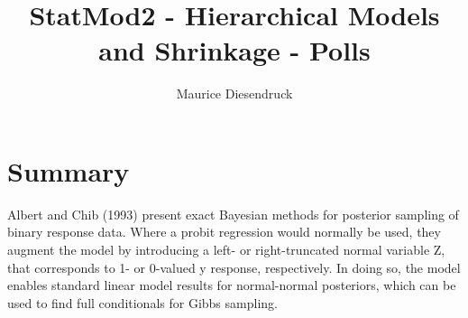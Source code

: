 \documentclass[12pt,letterpaper]{article}\usepackage[]{graphicx}\usepackage[]{color}
\author{Maurice Diesendruck\vspace{-2ex}}
\title{StatMod2 - Hierarchical Models and Shrinkage - Polls\vspace{-1ex}}
\begin{document}
\maketitle

\section{Summary}
Albert and Chib (1993) present exact Bayesian methods for posterior sampling
of binary response data. Where a probit regression would normally be used,
they augment the model by introducing a left- or right-truncated normal
variable Z, that corresponds to 1- or 0-valued y response, respectively. 
In doing so, the model enables standard linear model results for normal-normal
posteriors, which can be used to find full conditionals for Gibbs sampling.
\end{document}
